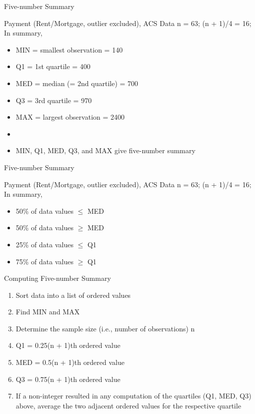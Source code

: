\documentclass[14pt]{beamer}\usepackage[]{graphicx}\usepackage[]{color}
\begin{document}
\begin{frame}[fragile]{Five-number Summary}

Payment (Rent/Mortgage, outlier excluded), ACS Data
n = 63;	(n + 1)/4 = 16;	In summary,

\begin{itemize} 
\item MIN = smallest observation = 140 
\item Q1  = 1st quartile = 400
\item MED = median (= 2nd quartile) = 700
\item Q3  = 3rd quartile = 970
\item MAX = largest observation = 2400
\item
\item MIN, Q1, MED, Q3, and MAX give five-number summary
\end{itemize}
\end{frame}

\begin{frame}[fragile]{Five-number Summary}

Payment (Rent/Mortgage, outlier excluded), ACS Data
n = 63;	(n + 1)/4 = 16;	In summary,

\begin{itemize} 
\item 50\% of data values $\le$ MED
\item 50\% of data values $\ge$ MED
\item 25\% of data values $\le$ Q1
\item 75\% of data values $\ge$ Q1
\end{itemize}
\end{frame}

\begin{frame}[fragile]{Computing Five-number Summary}

\begin{enumerate}
\item<1-> Sort data into a list of ordered values  
\item<2-> Find MIN and MAX
\item<3-> Determine the sample size (i.e., number of observations) n
\item<4-> Q1 = 0.25(n + 1)th ordered value
\item<5-> MED = 0.5(n + 1)th ordered value
\item<6-> Q3 = 0.75(n + 1)th ordered value
\item<7-> If a non-integer resulted in any computation of the quartiles  (Q1, MED, Q3) above, average the two adjacent ordered  values for the respective quartile
\end{enumerate}
\end{frame}
\end{document}
